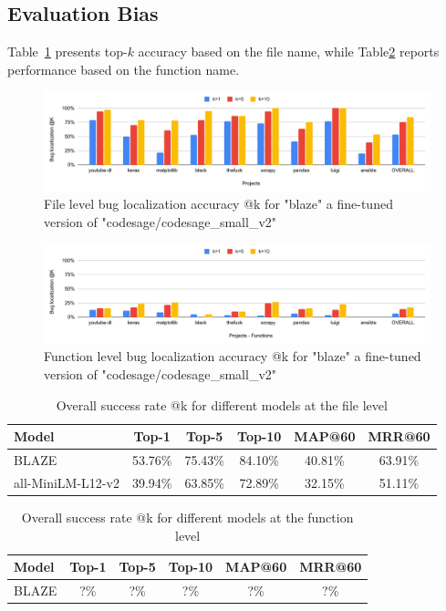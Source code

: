 \subsection{Evaluation Bias}
Table~\ref{fig:blaze@k_graph_file} presents top-$k$ accuracy based on the file name, while Table\ref{fig:blaze@k_graph_function} reports performance based on the function name.

\begin{figure}[H]
\centering
\includegraphics[width=1\columnwidth]{Figures/blaze@k_file.pdf}
\caption{File level bug localization accuracy @k for "blaze" a fine-tuned version of "codesage/codesage\_small\_v2"}
\label{fig:blaze@k_graph_file}
\end{figure}

\begin{figure}[H]
\centering
\includegraphics[width=1\columnwidth]{Figures/blaze@k_function.pdf}
\caption{Function level bug localization accuracy @k for "blaze" a fine-tuned version of "codesage/codesage\_small\_v2"}
\label{fig:blaze@k_graph_function}
\end{figure}

\begin{table}[H]
\centering
\begin{tabularx}{\textwidth}{lccccc}
\toprule
\textbf{Model} & \textbf{Top-1} & \textbf{Top-5} & \textbf{Top-10} & \textbf{MAP@60} & \textbf{MRR@60} \\
\midrule
BLAZE & 53.76\% & 75.43\% & 84.10\% & 40.81\% & 63.91\% \\
all-MiniLM-L12-v2 & 39.94\% & 63.85\% & 72.89\% & 32.15\% & 51.11\% \\
\bottomrule
\end{tabularx}
\caption{Overall success rate @k for different models at the file level}
\label{tab:model_performance_at_k}
\end{table}


\begin{table}[H]
\centering
\begin{tabularx}{\textwidth}{lccccc}
\toprule
\textbf{Model} & \textbf{Top-1} & \textbf{Top-5} & \textbf{Top-10} & \textbf{MAP@60} & \textbf{MRR@60} \\
\midrule
BLAZE & ?\% & ?\% & ?\% & ?\% & ?\% \\
\bottomrule
\end{tabularx}
\caption{Overall success rate @k for different models at the function level}
\label{tab:model_performance_at_k}
\end{table}
